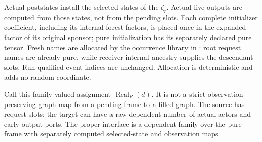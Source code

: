 \documentclass[11pt]{article}
\begin{document}
Actual poststates install the selected states of the $\zeta_r$. Actual live outputs are computed from those states, not from the pending slots. Each complete initializer coefficient, including its internal forest factors, is placed once in the expanded factor of its original sponsor; pure initialization has its separately declared pure tensor. Fresh names are allocated by the occurrence library in \texttt{}: root request names are already pure, while receiver-internal ancestry supplies the descendant slots. Run-qualified event indices are unchanged. Allocation is deterministic and adds no random coordinate.

Call this family-valued assignment $\operatorname{Real}_R(d)$. It is not a strict observation-preserving graph map from a pending frame to a filled graph. The source has request slots; the target can have a raw-dependent number of actual actors and early output ports. The proper interface is a dependent family over the pure frame with separately computed selected-state and observation maps.
\end{document}
